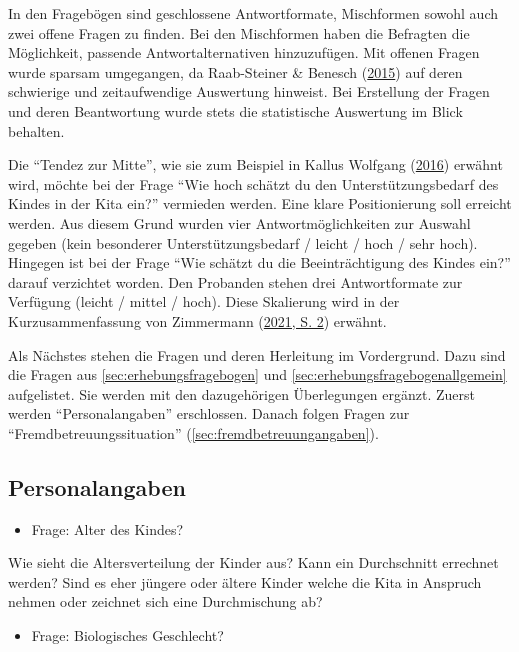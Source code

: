 \documentclass[
  ngerman,
  11pt,
  paper=a4,
  twoside,
  titlepage=true,
  openright,
  abstract=on,
  toc=listofnumbered,
  numbers=noenddot,
  chapterprefix=true,
  headings=optiontohead,
  svgnames,
  dvipsnames]{scrreprt}
\providecommand{\tightlist}{%
  \setlength{\itemsep}{0pt}\setlength{\parskip}{0pt}}
\begin{document}
In den Fragebögen sind geschlossene Antwortformate, Mischformen sowohl
auch zwei offene Fragen zu finden. Bei den Mischformen haben die
Befragten die Möglichkeit, passende Antwortalternativen hinzuzufügen.
Mit offenen Fragen wurde sparsam umgegangen, da Raab-Steiner \& Benesch
(\protect\hyperlink{ref-raabsteiner}{2015}) auf deren schwierige und
zeitaufwendige Auswertung hinweist. Bei Erstellung der Fragen und deren
Beantwortung wurde stets die statistische Auswertung im Blick behalten.

Die “Tendez zur Mitte”, wie sie zum Beispiel in Kallus Wolfgang
(\protect\hyperlink{ref-kallus2016}{2016}) erwähnt wird, möchte bei der
Frage “Wie hoch schätzt du den Unterstützungsbedarf des Kindes in der
Kita ein?” vermieden werden. Eine klare Positionierung soll erreicht
werden. Aus diesem Grund wurden vier Antwortmöglichkeiten zur Auswahl
gegeben (kein besonderer Unterstützungsbedarf / leicht / hoch / sehr
hoch). Hingegen ist bei der Frage “Wie schätzt du die Beeinträchtigung
des Kindes ein?” darauf verzichtet worden. Den Probanden stehen drei
Antwortformate zur Verfügung (leicht / mittel / hoch). Diese Skalierung
wird in der Kurzusammenfassung von Zimmermann
(\protect\hyperlink{ref-zimmermannExpertise}{2021, S. 2}) erwähnt.

Als Nächstes stehen die Fragen und deren Herleitung im Vordergrund. Dazu
sind die Fragen aus \cref{sec:erhebungsfragebogen} und
\cref{sec:erhebungsfragebogenallgemein} aufgelistet. Sie werden mit den
dazugehörigen Überlegungen ergänzt. Zuerst werden “Personalangaben”
erschlossen. Danach folgen Fragen zur “Fremdbetreuungssituation”
(\cref{sec:fremdbetreuungangaben}).

\hypertarget{sec:personalangaben}{%
\subsection{Personalangaben}\label{sec:personalangaben}}

\begin{itemize}
\tightlist
\item
  Frage: Alter des Kindes?
\end{itemize}

Wie sieht die Altersverteilung der Kinder aus? Kann ein Durchschnitt
errechnet werden? Sind es eher jüngere oder ältere Kinder welche die
Kita in Anspruch nehmen oder zeichnet sich eine Durchmischung ab?

\begin{itemize}
\tightlist
\item
  Frage: Biologisches Geschlecht?
\end{itemize}
\end{document}
